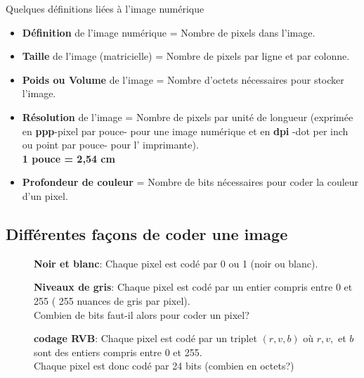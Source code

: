 \documentclass[10pt,fleqn]{article} %
\begin{document}
\begin{defi} Quelques définitions liées à l'image numérique

	\begin{itemize}
		\item 
		
		 \textbf{Définition} de l'image numérique = Nombre de pixels dans l'image.
		 
		 \vspace{0.3cm}
		
		\item \textbf{Taille} de l'image (matricielle) = Nombre de pixels par ligne et par colonne.
		
		\vspace{0.3cm}
		\item \textbf{Poids ou Volume } de l'image = Nombre d'octets nécessaires pour stocker l'image.
		
		\vspace{0.3cm}
		
		\item \textbf{Résolution} de l'image =  Nombre de pixels par unité de longueur (exprimée en \textbf{ppp}-pixel par pouce- pour une image numérique et en \textbf{dpi} -dot per inch ou point par pouce- pour l' imprimante).\\
		\textbf{1 pouce = 2,54 cm}
		
		\vspace{0.3cm}
		\item \textbf{Profondeur de couleur} = Nombre de bits nécessaires pour coder la couleur d'un pixel.
		
	\end{itemize}
\end{defi}	

\subsection {Différentes façons de coder une image }

\vspace{0.3cm}

\begin{description}
	\item[\RIGHTarrow] \textbf{Noir et blanc}: Chaque pixel est codé par 0 ou 1 (noir ou blanc).
	
	\vspace{0.3cm}
	\item[\RIGHTarrow] \textbf{Niveaux de gris}: Chaque pixel est codé par un entier compris entre 0 et 255 ( 255 nuances de gris par pixel).\\
	Combien de bits faut-il alors pour coder un pixel?
	
	\vspace{0.3cm}
	\item[\RIGHTarrow] \textbf{codage RVB}: Chaque pixel est codé par un triplet $(r,v,b)$ où $r,v,$ et $b$ sont des entiers compris entre 0 et 255.\\
	Chaque pixel est donc codé par 24 bits (combien en octets?)
\end{description}
\end{document}
